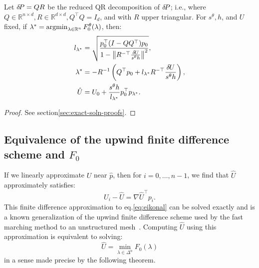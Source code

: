 \documentclass[smallcondensed]{svjour3}
\begin{document}
\begin{theorem}\label{thm:f0-exact}
  Let ${\delta \hspace{-0.14em} P} = QR$ be the reduced QR decomposition of ${\delta \hspace{-0.14em} P}$; i.e.,
  where
  $Q \in \mathbb{R}^{n \times d}, R \in \mathbb{R}^{d \times d},
  Q^\top Q = I_d$, and with $R$ upper triangular. For $s^\theta, h$,
  and $U$ fixed, if
  $\lambda^* = \operatorname{argmin}_{\lambda \in \mathbb{R}^n}
  F_0^\theta(\lambda)$, then:
  \begin{align}
    l_{\lambda^*} &= \sqrt{\frac{p_0^\top {(I - QQ^\top)} p_0}{1 - \left\|R^{-\top} \frac{{\delta \hspace{-0.09em} U}}{s^\theta h}\right\|^2}},\label{eq:l-star-expression} \\
    \lambda^* &= -R^{-1} \left(Q^\top p_0 + l_{\lambda^*} R^{-\top} \frac{{\delta \hspace{-0.09em} U}}{s^\theta h}\right),\label{eq:f0-exact-lambda} \\
    \hat{U} &= U_0 + \frac{s^\theta h}{l_{\lambda^*}} p_0^\top p_{\lambda^*}.\label{eq:f0-exact}
  \end{align}
\end{theorem}

\begin{proof}
  See section\@ \ref{sec:exact-soln-proofs}.
\end{proof}

\subsection{Equivalence of the upwind finite difference scheme and
  $F_0$}\label{ssec:equivalence}

If we linearly approximate $U$ near $\hat{p}$, then for
$i = 0, \hdots, n - 1$, we find that $\hat{U}$ approximately
satisfies:
\begin{equation}
  \label{eq:finite-differences}
  U_i - \hat{U} = \nabla \hat{U}^\top p_i.
\end{equation}
This finite difference approximation to eq.\@ \ref{eq:eikonal} can
be solved exactly and is a known generalization of the upwind finite
difference scheme used by the fast marching method to an unstructured
mesh~\cite{kimmel1998computing,sethian2000fast}. Computing $\hat{U}$
using this approximation is equivalent to solving:
\begin{equation}
  \hat{U} = \min_{\lambda \in \Delta^n} F_0(\lambda)
\end{equation}
in a sense made precise by the following theorem.
\end{document}

